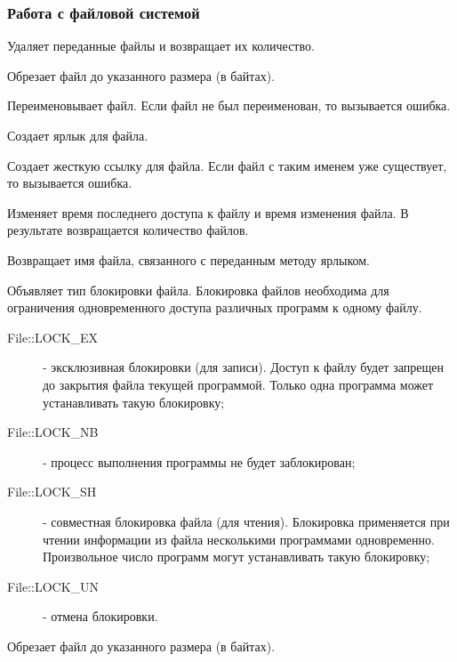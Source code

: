 \subsubsection*{Работа с файловой системой} 

\begin{methodlist}
  Удаляет переданные файлы и возвращает их количество. 

  Обрезает файл до указанного размера (в байтах). 

  Переименовывает файл. Если файл не был переименован, то вызывается ошибка. 

  Создает ярлык для файла. 

  Создает жесткую ссылку для файла. Если файл с таким именем уже существует, то вызывается ошибка. 

  Изменяет время последнего доступа к файлу и время изменения файла. В результате возвращается количество файлов.

  Возвращает имя файла, связанного с переданным методу ярлыком.

  Объявляет тип блокировки файла. Блокировка файлов необходима для ограничения одновременного доступа различных программ к одному файлу.
  \begin{description}
    \item[File::LOCK_EX] - эксклюзивная блокировки (для записи). Доступ к файлу будет запрещен до закрытия файла текущей программой. Только одна программа может устанавливать такую блокировку; 

    \item[File::LOCK_NB] - процесс выполнения программы не будет заблокирован;

    \item[File::LOCK_SH] - совместная блокировка файла (для чтения). Блокировка применяется при чтении информации из файла несколькими программами одновременно. Произвольное число программ могут устанавливать такую блокировку;

    \item[File::LOCK_UN] - отмена блокировки.
  \end{description}
 
  Обрезает файл до указанного размера (в байтах).
\end{methodlist}

